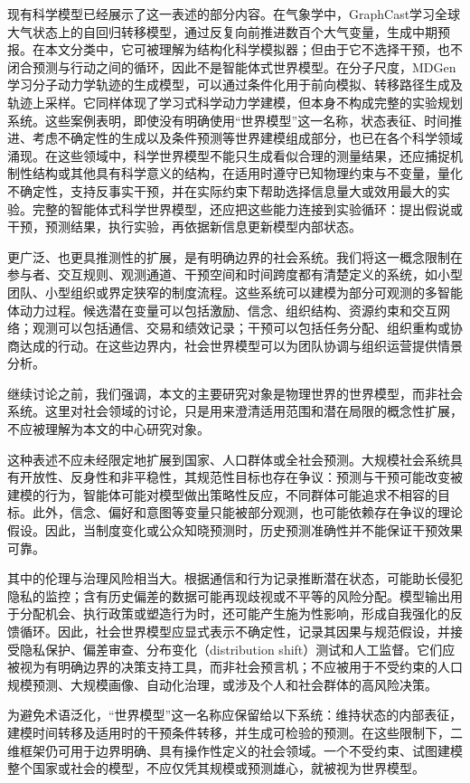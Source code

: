 现有科学模型已经展示了这一表述的部分内容。在气象学中，GraphCast学习全球大气状态上的自回归转移模型，通过反复向前推进数百个大气变量，生成中期预报\citep{lam2023graphcast}。在本文分类中，它可被理解为结构化科学模拟器；但由于它不选择干预，也不闭合预测与行动之间的循环，因此不是智能体式世界模型。在分子尺度，MDGen学习分子动力学轨迹的生成模型，可以通过条件化用于前向模拟、转移路径生成及轨迹上采样\citep{jing2024mdgen}。它同样体现了学习式科学动力学建模，但本身不构成完整的实验规划系统。这些案例表明，即使没有明确使用“世界模型”这一名称，状态表征、时间推进、考虑不确定性的生成以及条件预测等世界建模组成部分，也已在各个科学领域涌现。在这些领域中，科学世界模型不能只生成看似合理的测量结果，还应捕捉机制性结构或其他具有科学意义的结构，在适用时遵守已知物理约束与不变量，量化不确定性，支持反事实干预，并在实际约束下帮助选择信息量大或效用最大的实验。完整的智能体式科学世界模型，还应把这些能力连接到实验循环：提出假说或干预，预测结果，执行实验，再依据新信息更新模型内部状态。

更广泛、也更具推测性的扩展，是有明确边界的社会系统\citep{zhou2025socialworldmodels}。我们将这一概念限制在参与者、交互规则、观测通道、干预空间和时间跨度都有清楚定义的系统，如小型团队、小型组织或界定狭窄的制度流程。这些系统可以建模为部分可观测的多智能体动力过程。候选潜在变量可以包括激励、信念、组织结构、资源约束和交互网络；观测可以包括通信、交易和绩效记录；干预可以包括任务分配、组织重构或协商达成的行动。在这些边界内，社会世界模型可以为团队协调与组织运营提供情景分析。

继续讨论之前，我们强调，本文的主要研究对象是物理世界的世界模型，而非社会系统。这里对社会领域的讨论，只是用来澄清适用范围和潜在局限的概念性扩展，不应被理解为本文的中心研究对象。

这种表述不应未经限定地扩展到国家、人口群体或全社会预测。大规模社会系统具有开放性、反身性和非平稳性，其规范性目标也存在争议：预测与干预可能改变被建模的行为，智能体可能对模型做出策略性反应，不同群体可能追求不相容的目标。此外，信念、偏好和意图等变量只能被部分观测，也可能依赖存在争议的理论假设。因此，当制度变化或公众知晓预测时，历史预测准确性并不能保证干预效果可靠。

其中的伦理与治理风险相当大。根据通信和行为记录推断潜在状态，可能助长侵犯隐私的监控；含有历史偏差的数据可能再现歧视或不平等的风险分配。模型输出用于分配机会、执行政策或塑造行为时，还可能产生施为性影响，形成自我强化的反馈循环\citep{perdomo2020performative}。因此，社会世界模型应显式表示不确定性，记录其因果与规范假设，并接受隐私保护、偏差审查、分布变化（distribution shift）测试和人工监督。它们应被视为有明确边界的决策支持工具，而非社会预言机；不应被用于不受约束的人口规模预测、大规模画像、自动化治理，或涉及个人和社会群体的高风险决策。

为避免术语泛化，“世界模型”这一名称应保留给以下系统：维持状态的内部表征，建模时间转移及适用时的干预条件转移，并生成可检验的预测。在这些限制下，二维框架仍可用于边界明确、具有操作性定义的社会领域。一个不受约束、试图建模整个国家或社会的模型，不应仅凭其规模或预测雄心，就被视为世界模型。
